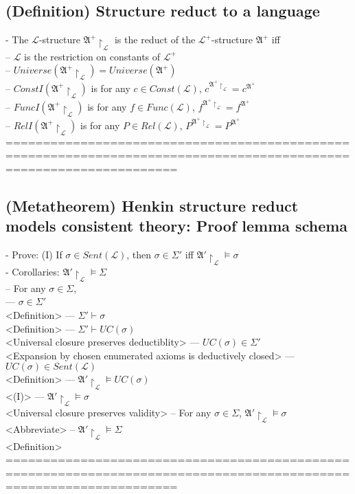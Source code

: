 \documentclass{book}
\newcommand{\means}[2]{#1^{#2}}
\begin{document}
\subsection{(Definition) Structure reduct to a language}
	- The $\mathcal{L}$-structure $\mathfrak{A}^+ \upharpoonright_\mathcal{L}$ is the reduct of the $\mathcal{L}^+$-structure $\mathfrak{A}^+$ iff \\
		-- $\mathcal{L}$ is the restriction on constants of $\mathcal{L}^+$ \\
		-- $Universe(\mathfrak{A}^+ \upharpoonright_\mathcal{L}) = Universe(\mathfrak{A}^+)$ \\
		-- $ConstI(\mathfrak{A}^+ \upharpoonright_\mathcal{L})$ is for any $c \in Const(\mathcal{L})$, $\means{c}{\mathfrak{A}^+ \upharpoonright_\mathcal{L}} = \means{c}{\mathfrak{A}^+}$ \\
		-- $FuncI(\mathfrak{A}^+ \upharpoonright_\mathcal{L})$ is for any $f \in Func(\mathcal{L})$, $\means{f}{\mathfrak{A}^+ \upharpoonright_\mathcal{L}} = \means{f}{\mathfrak{A}^+}$ \\
		-- $RelI(\mathfrak{A}^+ \upharpoonright_\mathcal{L})$ is for any $P \in Rel(\mathcal{L})$, $\means{P}{\mathfrak{A}^+ \upharpoonright_\mathcal{L}} = \means{P}{\mathfrak{A}^+}$ \\
	===================================================================================================================
\subsection{(Metatheorem) Henkin structure reduct models consistent theory: Proof lemma schema} %
	- Prove: (I) If $\sigma \in Sent(\mathcal{L})$, then $\sigma \in \Sigma'$ iff $\mathfrak{A}' \upharpoonright_\mathcal{L} \vDash \sigma$ \\
	- Corollaries: $\mathfrak{A}' \upharpoonright_\mathcal{L} \vDash \Sigma$ \\
		-- For any $\sigma \in \Sigma$, \\
			--- $\sigma \in \Sigma'$ \\ <Definition>
			--- $\Sigma' \vdash \sigma$ \\ <Definition>
			--- $\Sigma' \vdash UC(\sigma)$ \\ <Universal closure preserves deductiblity>
			--- $UC(\sigma) \in \Sigma'$ \\ <Expansion by chosen enumerated axioms is deductively closed>
			--- $UC(\sigma) \in Sent(\mathcal{L})$ \\ <Definition>
			--- $\mathfrak{A}' \upharpoonright_\mathcal{L} \vDash UC(\sigma)$ \\ <(I)>
			--- $\mathfrak{A}' \upharpoonright_\mathcal{L} \vDash \sigma$ \\ <Universal closure preserves validity>
		-- For any $\sigma \in \Sigma$, $\mathfrak{A}' \upharpoonright_\mathcal{L} \vDash \sigma$ \\ <Abbreviate>
		-- $\mathfrak{A}' \upharpoonright_\mathcal{L} \vDash \Sigma$ \\ <Definition>
	===================================================================================================================
\end{document}
